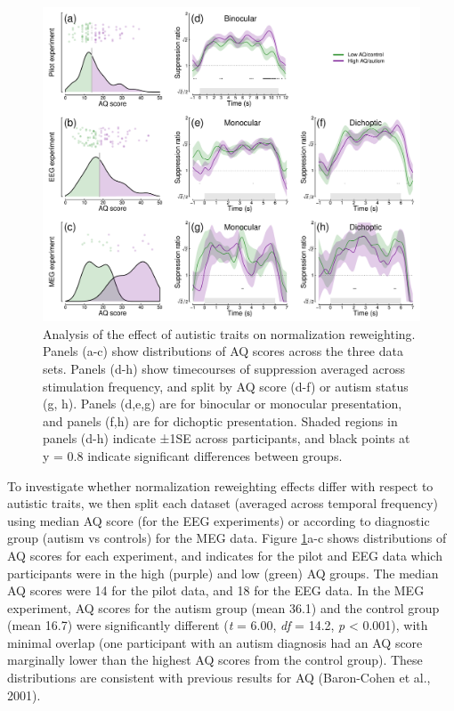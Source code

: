 \documentclass[
]{article}
\begin{document}
\begin{figure}

{\centering \includegraphics{Figures/AQfigure} 

}

\caption{Analysis of the effect of autistic traits on normalization reweighting. Panels (a-c) show distributions of AQ scores across the three data sets. Panels (d-h) show timecourses of suppression averaged across stimulation frequency, and split by AQ score (d-f) or autism status (g, h). Panels (d,e,g) are for binocular or monocular presentation, and panels (f,h) are for dichoptic presentation. Shaded regions in panels (d-h) indicate ±1SE across participants, and black points at y = 0.8 indicate significant differences between groups.}\label{fig:AQanalysis}
\end{figure}

To investigate whether normalization reweighting effects differ with respect to autistic traits, we then split each dataset (averaged across temporal frequency) using median AQ score (for the EEG experiments) or according to diagnostic group (autism vs controls) for the MEG data. Figure \ref{fig:AQanalysis}a-c shows distributions of AQ scores for each experiment, and indicates for the pilot and EEG data which participants were in the high (purple) and low (green) AQ groups. The median AQ scores were 14 for the pilot data, and 18 for the EEG data. In the MEG experiment, AQ scores for the autism group (mean 36.1) and the control group (mean 16.7) were significantly different (\emph{t} = 6.00, \emph{df} = 14.2, \emph{p} \textless{} 0.001), with minimal overlap (one participant with an autism diagnosis had an AQ score marginally lower than the highest AQ scores from the control group). These distributions are consistent with previous results for AQ (Baron-Cohen et al., 2001).
\end{document}
